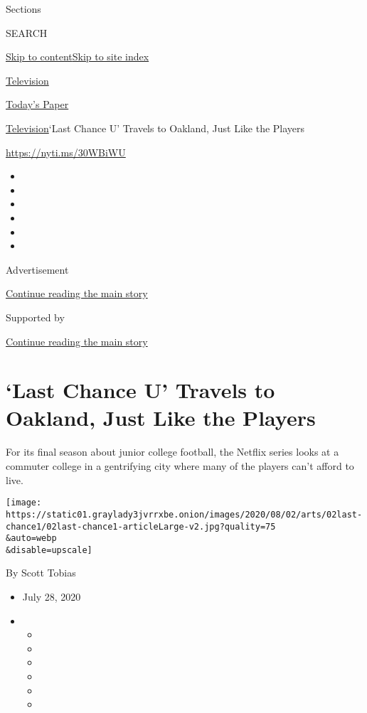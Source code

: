 Sections

SEARCH

\protect\hyperlink{site-content}{Skip to
content}\protect\hyperlink{site-index}{Skip to site index}

\href{https://www.nytimes3xbfgragh.onion/section/arts/television}{Television}

\href{https://myaccount.nytimes3xbfgragh.onion/auth/login?response_type=cookie\&client_id=vi}{}

\href{https://www.nytimes3xbfgragh.onion/section/todayspaper}{Today's
Paper}

\href{/section/arts/television}{Television}\textbar{}`Last Chance U'
Travels to Oakland, Just Like the Players

\url{https://nyti.ms/30WBiWU}

\begin{itemize}
\item
\item
\item
\item
\item
\item
\end{itemize}

Advertisement

\protect\hyperlink{after-top}{Continue reading the main story}

Supported by

\protect\hyperlink{after-sponsor}{Continue reading the main story}

\hypertarget{last-chance-u-travels-to-oakland-just-like-the-players}{%
\section{`Last Chance U' Travels to Oakland, Just Like the
Players}\label{last-chance-u-travels-to-oakland-just-like-the-players}}

For its final season about junior college football, the Netflix series
looks at a commuter college in a gentrifying city where many of the
players can't afford to live.

\texttt{[image: https://static01.graylady3jvrrxbe.onion/images/2020/08/02/arts/02last-chance1/02last-chance1-articleLarge-v2.jpg?quality=75\\\&auto=webp\\\&disable=upscale]}

By Scott Tobias

\begin{itemize}
\item
  July 28, 2020
\item
  \begin{itemize}
  \item
  \item
  \item
  \item
  \item
  \item
  \end{itemize}
\end{itemize}

